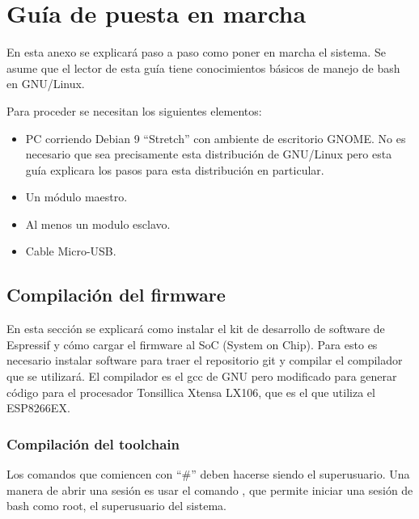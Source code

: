 \lstset {
	numbers=none,
	frame=none
}
\setcounter{figure}{0}
\section{Guía de puesta en marcha}
En esta anexo se explicará paso a paso como poner en marcha el sistema. Se asume que el lector de esta guía tiene conocimientos básicos de manejo de bash en GNU/Linux.

Para proceder se necesitan los siguientes elementos:
\begin{itemize}
	\item PC corriendo Debian 9 \enquote{Stretch} con ambiente de escritorio GNOME. No es necesario que sea precisamente esta distribución de GNU/Linux pero esta guía explicara los pasos para esta distribución en particular.
	\item Un módulo maestro.
	\item Al menos un modulo esclavo.
	\item Cable Micro-USB.
\end{itemize}

\subsection{Compilación del firmware}\label{sec:comp-firmware}
En esta sección se explicará como instalar el kit de desarrollo de software de Espressif y cómo cargar el firmware al SoC (System on Chip). Para esto es necesario instalar software para traer el repositorio git y compilar el compilador que se utilizará. El compilador es el gcc de GNU pero modificado para generar código para el procesador Tonsillica Xtensa LX106, que es el que utiliza el ESP8266EX.

\subsubsection{Compilación del toolchain}
Los comandos que comiencen con \enquote{\#} deben hacerse siendo el superusuario. Una manera de abrir una sesión es usar el comando , que permite iniciar una sesión de bash como root, el superusuario del sistema.


